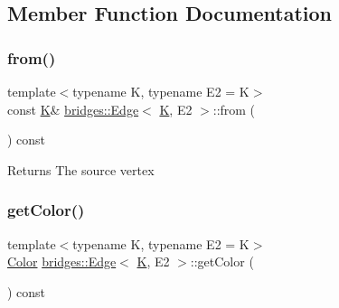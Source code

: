\subsection{Member Function Documentation}
\mbox{\label{classbridges_1_1_edge_abfa58a6a0dad99a49c347b795453b56f}} 
\subsubsection{\texorpdfstring{from()}{from()}}
{\footnotesize\ttfamily template$<$typename K, typename E2 = K$>$ \\
const \mbox{\hyperlink{namespacebridges_acfb0a4f7877d8f63de3e6862004c50edaa5f3c6a11b03839d46af9fb43c97c188}{K}}\& \mbox{\hyperlink{classbridges_1_1_edge}{bridges\+::\+Edge}}$<$ \mbox{\hyperlink{namespacebridges_acfb0a4f7877d8f63de3e6862004c50edaa5f3c6a11b03839d46af9fb43c97c188}{K}}, E2 $>$\+::from (\begin{DoxyParamCaption}{ }\end{DoxyParamCaption}) const\hspace{0.3cm}{\ttfamily [inline]}}

\begin{DoxyReturn}{Returns}
The source vertex 
\end{DoxyReturn}
\mbox{\label{classbridges_1_1_edge_a05ae24c3a4cd354532457257997e2c9c}} 
\subsubsection{\texorpdfstring{getColor()}{getColor()}}
{\footnotesize\ttfamily template$<$typename K, typename E2 = K$>$ \\
\mbox{\hyperlink{classbridges_1_1_color}{Color}} \mbox{\hyperlink{classbridges_1_1_edge}{bridges\+::\+Edge}}$<$ \mbox{\hyperlink{namespacebridges_acfb0a4f7877d8f63de3e6862004c50edaa5f3c6a11b03839d46af9fb43c97c188}{K}}, E2 $>$\+::get\+Color (\begin{DoxyParamCaption}{ }\end{DoxyParamCaption}) const\hspace{0.3cm}{\ttfamily [inline]}}


